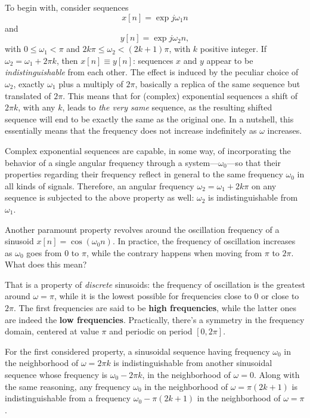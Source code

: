 \documentclass[\documentfontsize, twocolumn]{\classname}
\begin{document}
To begin with, consider se\-quen\-ces \[x[n] = \exp{j \omega_1 n}\] and \[y[n] = \exp{j \omega_2 n},\] with $0 \leq \omega_1 < \pi$ and $2 k \pi \leq \omega_2 < (2k+1)\pi$, with $k$ positive integer. If $\omega_2 = \omega_1 + 2 \pi k$, then $x[n] \equiv y[n]$: se\-quen\-ces $x$ and $y$ appear to be \emph{indistinguishable} from each other. The effect is induced by the peculiar choice of $\omega_2$, exactly $\omega_1$ plus a multiply of $2\pi$, basically a replica of the same sequence but translated of $2\pi$. This means that for (complex) exponential se\-quen\-ces a shift of $2\pi k$, with any $k$, leads to \emph{the very same} se\-quen\-ce, as the resulting shifted se\-quen\-ce will end to be exactly the same as the original one. In a nutshell, this essentially means that the frequency does not increase indefinitely as $\omega$ increases.

Complex exponential sequences are capable, in some way, of incorporating the behavior of a single angular frequency through a system---$\omega_0$---so that their properties regarding their frequency reflect in general to the same frequency $\omega_0$ in all kinds of signals. Therefore, an angular frequency $\omega_2 = \omega_1 + 2k \pi$ on any sequence is subjected to the above property as well: $\omega_2$ is indistinguishable from $\omega_1$.

Another paramount property revolves around the oscillation frequency of a sinusoid $x[n]=\cos{(\omega_0 n)}$. In practice, the frequency of oscillation increases as $\omega_0$ goes from $0$ to $\pi$, while the contrary happens when moving from $\pi$ to $2\pi$. What does this mean?

That is a property of \emph{discrete} sinusoids: the frequency of oscillation is the greatest around $\omega=\pi$, while it is the lowest possible for frequencies close to $0$ or close to $2\pi$. The first frequencies are said to be \textbf{high frequencies}, while the latter ones are indeed the \textbf{low frequencies}. Practically, there's a symmetry in the frequency domain, centered at value $\pi$ and periodic on period $[0, 2\pi]$.

For the first considered property, a sinusoidal se\-quen\-ce having frequency $\omega_0$ in the neighborhood of $\omega=2\pi k$ is indistinguishable from another sinusoidal se\-quen\-ce whose frequency is $\omega_0 - 2 \pi k$, in the neighborhood of $\omega = 0$. Along with the same reasoning, any frequency $\omega_0$ in the neighborhood of $\omega = \pi (2k + 1)$ is indistinguishable from a frequency $\omega_0 - \pi(2k + 1)$ in the neighborhood of $\omega = \pi$.
\end{document}
